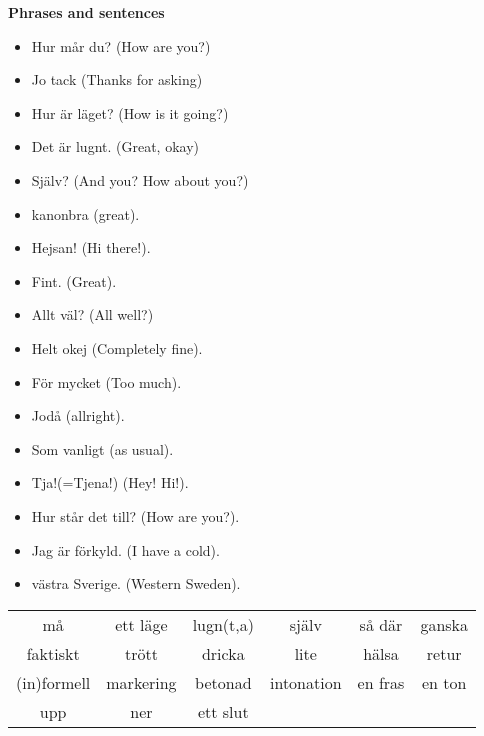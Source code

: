 
\begin{flushleft}
    \textbf{Phrases and sentences}
    \begin{itemize}
        \item Hur mår du? (How are you?)
        \item Jo tack (Thanks for asking)
        \item Hur är läget? (How is it going?)
        \item Det är lugnt. (Great, okay)
        \item Själv? (And you? How about you?)
        \item kanonbra (great).
        \item Hejsan! (Hi there!).
        \item Fint. (Great).
        \item Allt väl? (All well?)
        \item Helt okej (Completely fine).
        \item För mycket (Too much).
        \item Jodå (allright).
        \item Som vanligt (as usual).
        \item Tja!(=Tjena!) (Hey! Hi!).
        \item Hur står det till? (How are you?).
        \item Jag är förkyld. (I have a cold).
        \item västra Sverige. (Western Sweden).
    \end{itemize}
\end{flushleft}

\begin{center}
    \begin{tabular}{|c c c c c c|}
        \hline
        må & ett läge & lugn(t,a) & själv & så där & ganska \\
        faktiskt & trött & dricka & lite & hälsa & retur \\
        (in)formell  & markering & betonad & intonation & en fras & en ton \\
        upp & ner & ett slut &  &  &  \\
        \hline
    \end{tabular}
\end{center}

